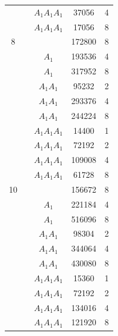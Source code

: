 \documentclass{amsart}
\theoremstyle{definition}
\theoremstyle{plain}
\begin{document}
\begin{longtable}{ccccc}
 & & \(A_{1} A_{1} A_{1} \) &37056 & 4 \\
 & & \(A_{1} A_{1} A_{1} \) &17056 & 8 \\
8 & & \(\) &172800 & 8 \\
 & & \(A_{1} \) &193536 & 4 \\
 & & \(A_{1} \) &317952 & 8 \\
 & & \(A_{1} A_{1} \) &95232 & 2 \\
 & & \(A_{1} A_{1} \) &293376 & 4 \\
 & & \(A_{1} A_{1} \) &244224 & 8 \\
 & & \(A_{1} A_{1} A_{1} \) &14400 & 1 \\
 & & \(A_{1} A_{1} A_{1} \) &72192 & 2 \\
 & & \(A_{1} A_{1} A_{1} \) &109008 & 4 \\
 & & \(A_{1} A_{1} A_{1} \) &61728 & 8 \\
10 & & \(\) &156672 & 8 \\
 & & \(A_{1} \) &221184 & 4 \\
 & & \(A_{1} \) &516096 & 8 \\
 & & \(A_{1} A_{1} \) &98304 & 2 \\
 & & \(A_{1} A_{1} \) &344064 & 4 \\
 & & \(A_{1} A_{1} \) &430080 & 8 \\
 & & \(A_{1} A_{1} A_{1} \) &15360 & 1 \\
 & & \(A_{1} A_{1} A_{1} \) &72192 & 2 \\
 & & \(A_{1} A_{1} A_{1} \) &134016 & 4 \\
 & & \(A_{1} A_{1} A_{1} \) &121920 & 8 \\
 \hline
\end{longtable}
\end{document}
